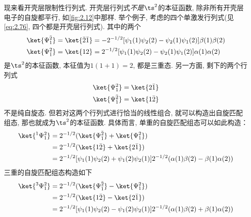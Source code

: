 现来看开壳层限制性行列式. 
开壳层行列式\emph{不是}$\ts^2$的本征函数, 
除非所有开壳层电子的自旋都平行, 
如\autoref{fig:2.12}中那样. 
举个例子, 
考虑的四个单激发行列式(见\autoref{eq:2.76}, 
四个都是开壳层行列式). 
其中的两个
\begin{subequations}\label{eq:2.258}
	\begin{align}
	\ket{\Psi_1^{\bar{2}}} & = \ket{\bar{2}\bar{1}} = -2^{-1/2}[\psi_1(1)\psi_2(2) - \psi_2(1)\psi_1(2)]\beta(1)\beta(2)\\
	\ket{\Psi_{\bar{1}}^2} & = \ket{12}  = 2^{-1/2}[\psi_1(1)\psi_2(2) - \psi_2(1)\psi_1(2)]\alpha(1)\alpha(2)
	\end{align}
\end{subequations} 
是$\ts^2$的本征函数, 
本征值为$1(1+1)=2$, 
都是三重态. 
另一方面, 
剩下的两个行列式
\begin{subequations}\label{eq:2.259}
	\begin{align}
	\ket{\Psi_1^2} & = \ket{2\bar{1}}\\
	\ket{\Psi_{\bar{1}}^{\bar{2}}} & = \ket{1\bar{2}}
	\end{align}
\end{subequations} 
不是纯自旋态. 
但若对这两个行列式进行恰当的线性组合, 
就可以构造出自旋匹配组态, 
那也就成为$\ts^2$的本征函数. 
具体而言, 
单重的自旋匹配组态可以如此构造：
\begin{align}
\ket{^1\Psi_1^2} & = 2^{-1/2}(\ket{\Psi_{\bar{1}}^{\bar{2}}} + \ket{\Psi_1^2}) \notag\\
& =2^{-1/2}(\ket{1\bar{2}} + \ket{2\bar{1}})\notag \\
	& =2^{-1/2}[ \psi_1(1)\psi_2(2) + \psi_1(2)\psi_2(1)] 2^{-1/2}(\alpha(1)\beta(2) - \beta(1)\alpha(2)) \label{eq:2.260}
\end{align}
三重的自旋匹配组态构造如下
\begin{align}
\ket{^3\Psi_1^2} & = 2^{-1/2}(\ket{\Psi_{\bar{1}}^{\bar{2}}} - \ket{\Psi_1^2}) \notag\\
& =2^{-1/2}(\ket{1\bar{2}} - \ket{2\bar{1}})\notag \\
& =2^{-1/2}[ \psi_1(1)\psi_2(2) - \psi_1(2)\psi_2(1)] 2^{-1/2}(\alpha(1)\beta(2) + \beta(1)\alpha(2))
\end{align}

